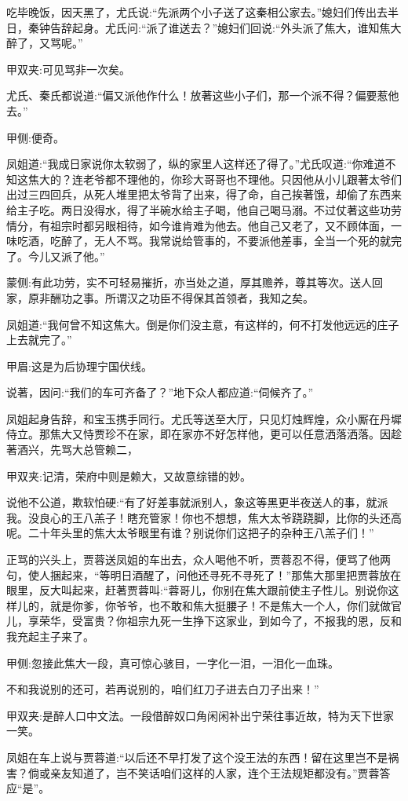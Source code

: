 \begin{parag}
    吃毕晚饭，因天黑了，尤氏说:“先派两个小子送了这秦相公家去。”媳妇们传出去半日，秦钟告辞起身。尤氏问:“派了谁送去？”媳妇们回说:“外头派了焦大，谁知焦大醉了，又骂呢。”\begin{note}甲双夹:可见骂非一次矣。\end{note}尤氏、秦氏都说道:“偏又派他作什么！放著这些小子们，那一个派不得？偏要惹他去。”\begin{note}甲侧:便奇。\end{note}凤姐道:“我成日家说你太软弱了，纵的家里人这样还了得了。”尤氏叹道:“你难道不知这焦大的？连老爷都不理他的，你珍大哥哥也不理他。只因他从小儿跟著太爷们出过三四回兵，从死人堆里把太爷背了出来，得了命，自己挨著饿，却偷了东西来给主子吃。两日没得水，得了半碗水给主子喝，他自己喝马溺。不过仗著这些功劳情分，有祖宗时都另眼相待，如今谁肯难为他去。他自己又老了，又不顾体面，一味吃酒，吃醉了，无人不骂。我常说给管事的，不要派他差事，全当一个死的就完了。今儿又派了他。”\begin{note}蒙侧:有此功劳，实不可轻易摧折，亦当处之道，厚其赡养，尊其等次。送人回家，原非酬功之事。所谓汉之功臣不得保其首领者，我知之矣。\end{note}凤姐道:“我何曾不知这焦大。倒是你们没主意，有这样的，何不打发他远远的庄子上去就完了。”\begin{note}甲眉:这是为后协理宁国伏线。\end{note}说著，因问:“我们的车可齐备了？”地下众人都应道:“伺候齐了。”
\end{parag}


\begin{parag}
    凤姐起身告辞，和宝玉携手同行。尤氏等送至大厅，只见灯烛辉煌，众小厮在丹墀侍立。那焦大又恃贾珍不在家，即在家亦不好怎样他，更可以任意洒落洒落。因趁著酒兴，先骂大总管赖二，\begin{note}甲双夹:记清，荣府中则是赖大，又故意综错的妙。\end{note}说他不公道，欺软怕硬:“有了好差事就派别人，象这等黑更半夜送人的事，就派我。没良心的王八羔子！瞎充管家！你也不想想，焦大太爷跷跷脚，比你的头还高呢。二十年头里的焦大太爷眼里有谁？别说你们这把子的杂种王八羔子们！”
\end{parag}


\begin{parag}
    正骂的兴头上，贾蓉送凤姐的车出去，众人喝他不听，贾蓉忍不得，便骂了他两句，使人捆起来，“等明日酒醒了，问他还寻死不寻死了！”那焦大那里把贾蓉放在眼里，反大叫起来，赶著贾蓉叫:“蓉哥儿，你别在焦大跟前使主子性儿。别说你这样儿的，就是你爹，你爷爷，也不敢和焦大挺腰子！不是焦大一个人，你们就做官儿，享荣华，受富贵？你祖宗九死一生挣下这家业，到如今了，不报我的恩，反和我充起主子来了。\begin{note}甲侧:忽接此焦大一段，真可惊心骇目，一字化一泪，一泪化一血珠。\end{note}不和我说别的还可，若再说别的，咱们红刀子进去白刀子出来！”\begin{note}甲双夹:是醉人口中文法。一段借醉奴口角闲闲补出宁荣往事近故，特为天下世家一笑。\end{note}凤姐在车上说与贾蓉道:“以后还不早打发了这个没王法的东西！留在这里岂不是祸害？倘或亲友知道了，岂不笑话咱们这样的人家，连个王法规矩都没有。”贾蓉答应“是”。
\end{parag}


